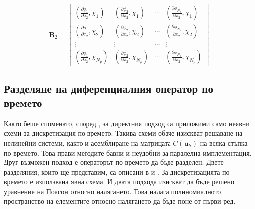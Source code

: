 \documentclass[12pt]{report}
\begin{document}
\begin{equation*}
\mathbf{B}_2 = \begin{bmatrix}
\left(\frac{\partial\phi_1}{\partial x_2}, \chi_1\right) & \left(\frac{\partial\phi_2}{\partial x_2}, \chi_1\right) & \cdots & \left(\frac{\partial\phi_{N_v}}{\partial x_2}, \chi_1\right) \\
\left(\frac{\partial\phi_1}{\partial x_2}, \chi_2\right) & \left(\frac{\partial\phi_2}{\partial x_2}, \chi_2\right) & \cdots & \left(\frac{\partial\phi_{N_v}}{\partial x_2}, \chi_2\right) \\
\vdots & \vdots & \cdots & \vdots \\
\left(\frac{\partial\phi_1}{\partial x_2}, \chi_{N_p}\right) & \left(\frac{\partial\phi_2}{\partial x_2}, \chi_{N_p}\right) & \cdots & \left(\frac{\partial\phi_{N_v}}{\partial x_2}, \chi_{N_p}\right)
\end{bmatrix}
\end{equation*}

\subsection{Разделяне на диференциалния оператор по времето}
Както беше споменато, според \cite{gresho-fem}, за директния подход са приложими само неявни схеми за дискретизация по времето. Такива схеми обаче изискват решаване на нелинейни системи, както и асемблиране на матрицата $C(\mathbf{u}_h)$ на всяка стъпка по времето. Това прави методите бавни и неудобни за паралелна имплементация. Друг възможен подход е операторът по времето да бъде разделен. Двете разделяния, които ще представим, са описани в \cite{Bridson} и \cite{Chorin-operator-split}. За дискретизацията по времето е използвана явна схема. И двата подхода изискват да бъде решено уравнение на Поасон относно налягането. Това налага полиномиалното пространство на елементите относно налягането да бъде поне от първи ред.
\end{document}
